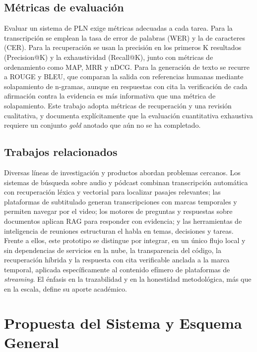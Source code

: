 \documentclass[12pt,a4paper]{article}
\begin{document}
\subsection{Métricas de evaluación}

Evaluar un sistema de PLN exige métricas adecuadas a cada tarea. Para la transcripción se emplean la tasa de error de palabras (WER) y la de caracteres (CER). Para la recuperación se usan la precisión en los primeros K resultados (Precision@K) y la exhaustividad (Recall@K), junto con métricas de ordenamiento como MAP, MRR y nDCG. Para la generación de texto se recurre a ROUGE y BLEU, que comparan la salida con referencias humanas mediante solapamiento de n-gramas, aunque en respuestas con cita la verificación de cada afirmación contra la evidencia es más informativa que una métrica de solapamiento. Este trabajo adopta métricas de recuperación y una revisión cualitativa, y documenta explícitamente que la evaluación cuantitativa exhaustiva requiere un conjunto \emph{gold} anotado que aún no se ha completado.

\subsection{Trabajos relacionados}

Diversas líneas de investigación y productos abordan problemas cercanos. Los sistemas de búsqueda sobre audio y pódcast combinan transcripción automática con recuperación léxica y vectorial para localizar pasajes relevantes; las plataformas de subtitulado generan transcripciones con marcas temporales y permiten navegar por el video; los motores de preguntas y respuestas sobre documentos aplican RAG para responder con evidencia; y las herramientas de inteligencia de reuniones estructuran el habla en temas, decisiones y tareas. Frente a ellos, este prototipo se distingue por integrar, en un único flujo local y sin dependencias de servicios en la nube, la transparencia del código, la recuperación híbrida y la respuesta con cita verificable anclada a la marca temporal, aplicada específicamente al contenido efímero de plataformas de \emph{streaming}. El énfasis en la trazabilidad y en la honestidad metodológica, más que en la escala, define su aporte académico.

\section{Propuesta del Sistema y Esquema General}
\label{sec:propuesta}
\end{document}
